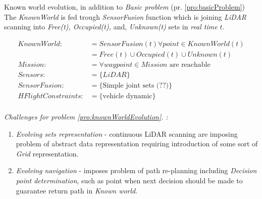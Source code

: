 \begin{problem}{Known world evolution,}\label{pro:knownWorldEvolution}
    in addition to \emph{Basic problem} (pr. \ref{pro:basicProblem}) The \emph{KnownWorld} is fed trough \emph{SensorFusion} function which is joining \emph{LiDAR} scanning into \emph{Free(t), Occupied(t),} and, \emph{Unknown(t)} sets in \emph{real time} $t$. 

    \begin{equation}\label{eq:knownworldEvolutionProblemDefinition}
        \begin{aligned}
            KnownWorld:&= SensorFusion(t)\forall point\in KnownWorld(t)\\
                       &=Free(t) \cup Occupied(t) \cup Unknown(t)\\
            Mission:&= \forall waypoint\in Mission \text{ are reachable}\\
            Sensors:&= \{LiDAR\}\\
            SensorFusion:&= \{\text{Simple joint sets (??)}\}\\
            HFlightConstraints:&=\{\text{vehicle dynamic}\}\\
        \end{aligned}
    \end{equation}
    
    \ifproblemchallenge
    \noindent \emph{Challenges for problem  \ref{pro:knownWorldEvolution}. :}
    \begin{enumerate}
        \item \emph{Evolving sets representation} - continuous LiDAR scanning are imposing problem of abstract data representation requiring introduction of some sort of \emph{Grid} representation.
        \item \emph{Evolving navigation} - imposes problem of path re-planning including \emph{Decision point determination}, such as point when next decision should be made to guarantee return path in \emph{Known world}.
    \end{enumerate}
    \fi
\end{problem}



